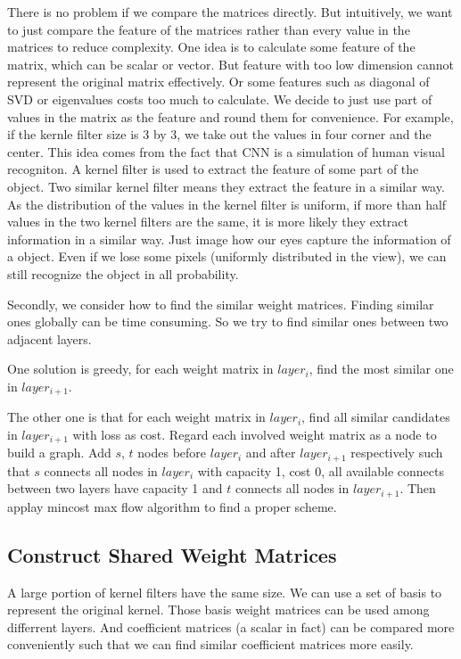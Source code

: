 \documentclass[letterpaper, 10 pt, conference]{ieeeconf}  %
\begin{document}
There is no problem if we compare the matrices directly. But intuitively, we want to just compare the feature of the matrices rather than every value in the matrices to reduce complexity. One idea is to calculate some feature of the matrix, which can be scalar or vector. But feature with too low dimension cannot represent the original matrix effectively. Or some features such as diagonal of SVD or eigenvalues costs too much to calculate. We decide to just use part of values in the matrix as the feature and round them for convenience. For example, if the kernle filter size is 3 by 3, we take out the values in four corner and the center. This idea comes from the fact that CNN is a simulation of human visual recogniton. A kernel filter is used to extract the feature of some part of the object. Two similar kernel filter means they extract the feature in a similar way. As the distribution of the values in the kernel filter is uniform, if more than half values in the two kernel filters are the same, it is more likely they extract information in a similar way. Just image how our eyes capture the information of a object. Even if we lose some pixels (uniformly distributed in the view), we can still recognize the object in all probability.

Secondly, we consider how to find the similar weight matrices. Finding similar ones globally can be time consuming. So we try to find similar ones between two adjacent layers. 

One solution is greedy, for each weight matrix in $layer_i$, find the most similar one in $layer_{i+1}$. 

The other one is that for each weight matrix in $layer_i$, find all similar candidates in $layer_{i+1}$ with loss as cost. Regard each involved weight matrix as a node to build a graph. Add $s$, $t$ nodes before $layer_{i}$ and after $layer_{i+1}$ respectively such that $s$ connects all nodes in $layer_{i}$ with capacity 1, cost 0, all available connects between two layers have capacity 1 and $t$ connects all nodes in $layer_{i+1}$. Then applay mincost max flow algorithm to find a proper scheme.
\subsection{Construct Shared Weight Matrices}
A large portion of kernel filters have the same size. We can use a set of basis to represent the original kernel. Those basis weight matrices can be used among differrent layers. And coefficient matrices (a scalar in fact) can be compared more conveniently such that we can find similar coefficient matrices more easily. 
\end{document}
